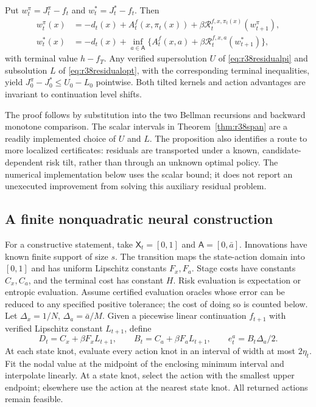 \begin{proposition}\label{prop:r38tilt}
Put $w_t^\pi=J_t^\pi-f_t$ and $w_t^*=J_t^*-f_t$. Then
\begin{align}
 w_t^\pi(x)&=-d_t(x)+A_t^f(x,\pi_t(x))
       +\beta\mathcal R_t^{f,x,\pi_t(x)}(w_{t+1}^\pi),\label{eq:r38residualpi}\\
 w_t^*(x)&=-d_t(x)+\inf_{a\in\mathsf A}
       \{A_t^f(x,a)+\beta\mathcal R_t^{f,x,a}(w_{t+1}^*)\},\label{eq:r38residualopt}
\end{align}
with terminal value $h-f_T$. Any verified supersolution $U$ of
\eqref{eq:r38residualpi} and subsolution $L$ of
\eqref{eq:r38residualopt}, with the corresponding terminal inequalities,
yield $J_0^\pi-J_0^*\leq U_0-L_0$ pointwise. Both tilted kernels and action
advantages are invariant to continuation level shifts.
\end{proposition}

The proof follows by substitution into the two Bellman recursions and
backward monotone comparison. The scalar intervals in
Theorem~\ref{thm:r38span} are a readily implemented choice of $U$ and $L$.
The proposition also identifies a route to more localized certificates:
residuals are transported under a known, candidate-dependent risk tilt,
rather than through an unknown optimal policy. The numerical implementation
below uses the scalar bound; it does not report an unexecuted improvement
from solving this auxiliary residual problem.

\subsection{A finite nonquadratic neural construction}
For a constructive statement, take $\mathsf X_t=[0,1]$ and
$\mathsf A=[0,\bar a]$. Innovations have known finite support of size $s$.
The transition maps the state-action domain into $[0,1]$ and has uniform
Lipschitz constants $F_x,F_a$. Stage costs have constants $C_x,C_a$, and the
terminal cost has constant $H$. Risk evaluation is expectation or entropic
evaluation. Assume certified evaluation oracles whose error can be reduced
to any specified positive tolerance; the cost of doing so is counted below.
Let $\Delta_x=1/N$, $\Delta_a=\bar a/M$. Given a piecewise linear
continuation $f_{t+1}$ with verified Lipschitz constant $L_{t+1}$, define
\[
 D_t=C_x+\beta F_xL_{t+1},\qquad
 B_t=C_a+\beta F_aL_{t+1},\qquad e_t^a=B_t\Delta_a/2.
\]
At each state knot, evaluate every action knot in an interval of width at
most $2\eta_t$. Fit the nodal value at the midpoint of the enclosing minimum
interval and interpolate linearly. At a state knot, select the action with
the smallest upper endpoint; elsewhere use the action at the nearest state
knot. All returned actions remain feasible.

